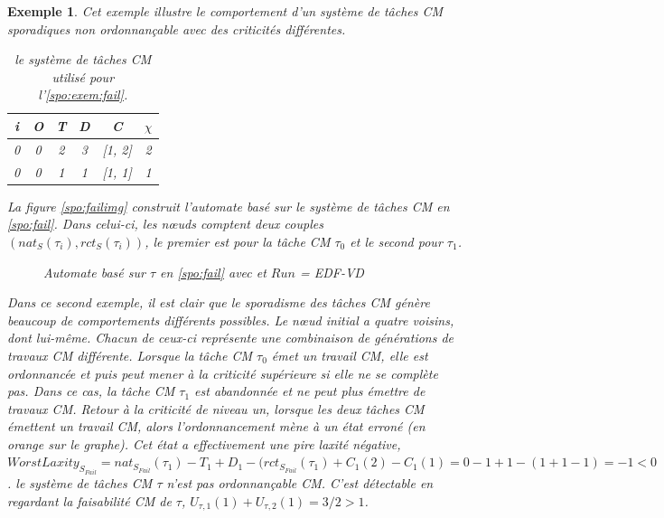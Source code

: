 \documentclass[12pt,a4paper,oneside]{book}
\theoremstyle{break}
\newtheorem{exem}{Exemple}[chapter]
\theoremstyle{breakplain}
\begin{document}
\begin{exem}
\label{spo:exem:fail}
Cet exemple illustre le comportement d'un système de tâches CM sporadiques non ordonnançable avec des criticités différentes.
\begin{table}[h]
    \centering
\begin{tabular}{|c|c|c|c|c|c|}
\hline
i &O & T & D & C & $\chi$\\
\hline
0 & 0 & 2 & 3 & [1, 2]& 2\\
\hline
0 & 0 & 1 & 1 & [1, 1]& 1\\
\hline
\end{tabular}
    
\caption{le système de tâches CM utilisé pour l'\autoref{spo:exem:fail}.}
\label{spo:fail}
\end{table}
La figure \autoref{spo:failimg} construit l'automate basé sur le système de tâches CM en \autoref{spo:fail}. Dans celui-ci, les nœuds comptent deux couples $(nat_S(\tau_i), rct_S(\tau_i))$, le premier est pour la tâche CM $\tau_0$ et le second pour $\tau_1$.\\

\begin{figure}[h]
    \centering
    \resizebox{\textwidth}{!}{
    \fontsize{28pt}{12pt}\selectfont
    
    }
    
\caption{Automate basé sur $\tau$ en \autoref{spo:fail} avec et $Run$ = \textit{EDF-VD}}
\label{spo:failimg}
\end{figure}

Dans ce second exemple, il est clair que le sporadisme des tâches CM génère beaucoup de comportements différents possibles. Le nœud initial a quatre voisins, dont lui-même. Chacun de ceux-ci représente une combinaison de générations de travaux CM différente. Lorsque la tâche CM $\tau_0$ émet un travail CM, elle est ordonnancée et puis peut mener à la criticité supérieure si elle ne se complète pas. Dans ce cas, la tâche CM $\tau_1$ est abandonnée et ne peut plus émettre de travaux CM. Retour à la criticité de niveau un, lorsque les deux tâches CM émettent un travail CM, alors l'ordonnancement mène à un état erroné (en orange sur le graphe). Cet état a effectivement une pire laxité négative, $WorstLaxity_{S_{Fail}} = nat_{S_{Fail}}(\tau_1)-T_1+D_1-(rct_{S_{Fail}}(\tau_1) +C_1(2) - C_1(1) = 0 -1+1 -(1 +1 -1) = -1 <0$. le système de tâches CM $\tau$ n'est pas ordonnançable CM. C'est détectable en regardant la faisabilité CM de $\tau$, $U_{\tau, 1}(1) + U_{\tau, 2}(1)= 3/2 >1$.
\end{exem}
\end{document}

